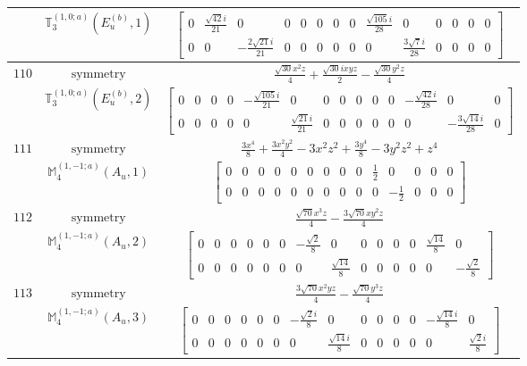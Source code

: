 \documentclass[fleqn,8pt,landscape]{jsarticle}
\begin{document}
\begin{longtable}{ccc}
$  $ & $ \mathbb{T}_{3}^{(1,0;a)}(E_{u}^{(b)},1) $ & $ \begin{bmatrix} 0 & \frac{\sqrt{42} i}{21} & 0 & 0 & 0 & 0 & 0 & 0 & \frac{\sqrt{105} i}{28} & 0 & 0 & 0 & 0 & 0 \\ 0 & 0 & - \frac{2 \sqrt{21} i}{21} & 0 & 0 & 0 & 0 & 0 & 0 & \frac{3 \sqrt{7} i}{28} & 0 & 0 & 0 & 0 \end{bmatrix} $ \\ \hline
$ 110 $ & $ \text{symmetry} $ & $ \frac{\sqrt{30} x^{2} z}{4} + \frac{\sqrt{30} i x y z}{2} - \frac{\sqrt{30} y^{2} z}{4} $ \\
$  $ & $ \mathbb{T}_{3}^{(1,0;a)}(E_{u}^{(b)},2) $ & $ \begin{bmatrix} 0 & 0 & 0 & 0 & - \frac{\sqrt{105} i}{21} & 0 & 0 & 0 & 0 & 0 & 0 & - \frac{\sqrt{42} i}{28} & 0 & 0 \\ 0 & 0 & 0 & 0 & 0 & \frac{\sqrt{21} i}{21} & 0 & 0 & 0 & 0 & 0 & 0 & - \frac{3 \sqrt{14} i}{28} & 0 \end{bmatrix} $ \\ \hline
$ 111 $ & $ \text{symmetry} $ & $ \frac{3 x^{4}}{8} + \frac{3 x^{2} y^{2}}{4} - 3 x^{2} z^{2} + \frac{3 y^{4}}{8} - 3 y^{2} z^{2} + z^{4} $ \\
$  $ & $ \mathbb{M}_{4}^{(1,-1;a)}(A_{u},1) $ & $ \begin{bmatrix} 0 & 0 & 0 & 0 & 0 & 0 & 0 & 0 & 0 & \frac{1}{2} & 0 & 0 & 0 & 0 \\ 0 & 0 & 0 & 0 & 0 & 0 & 0 & 0 & 0 & 0 & - \frac{1}{2} & 0 & 0 & 0 \end{bmatrix} $ \\ \hline
$ 112 $ & $ \text{symmetry} $ & $ \frac{\sqrt{70} x^{3} z}{4} - \frac{3 \sqrt{70} x y^{2} z}{4} $ \\
$  $ & $ \mathbb{M}_{4}^{(1,-1;a)}(A_{u},2) $ & $ \begin{bmatrix} 0 & 0 & 0 & 0 & 0 & 0 & - \frac{\sqrt{2}}{8} & 0 & 0 & 0 & 0 & 0 & \frac{\sqrt{14}}{8} & 0 \\ 0 & 0 & 0 & 0 & 0 & 0 & 0 & \frac{\sqrt{14}}{8} & 0 & 0 & 0 & 0 & 0 & - \frac{\sqrt{2}}{8} \end{bmatrix} $ \\ \hline
$ 113 $ & $ \text{symmetry} $ & $ \frac{3 \sqrt{70} x^{2} y z}{4} - \frac{\sqrt{70} y^{3} z}{4} $ \\
$  $ & $ \mathbb{M}_{4}^{(1,-1;a)}(A_{u},3) $ & $ \begin{bmatrix} 0 & 0 & 0 & 0 & 0 & 0 & - \frac{\sqrt{2} i}{8} & 0 & 0 & 0 & 0 & 0 & - \frac{\sqrt{14} i}{8} & 0 \\ 0 & 0 & 0 & 0 & 0 & 0 & 0 & \frac{\sqrt{14} i}{8} & 0 & 0 & 0 & 0 & 0 & \frac{\sqrt{2} i}{8} \end{bmatrix} $ \\ \hline

\end{longtable}
\end{document}
